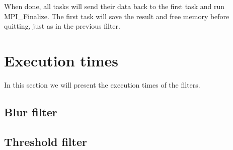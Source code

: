 \documentclass[titlepage, a4paper]{article}
\begin{document}
When done, all tasks will send their data back to the first task and run MPI\_Finalize. The first task will save the result and free memory before quitting, just as in the previous filter.

\section{Execution times}
In this section we will present the execution times of the filters.

\subsection{Blur filter}


\subsection{Threshold filter}
\end{document}
